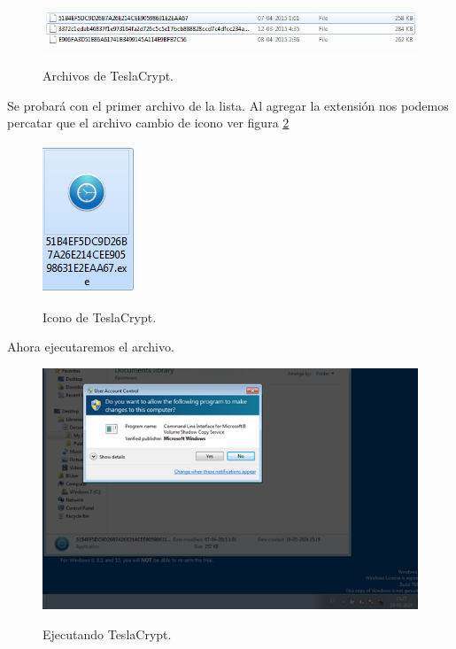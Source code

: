 \documentclass[stu, 11pt, letterpaper, donotrepeattitle, floatsintext, natbib]{apa7}
\begin{document}
\begin{figure}[H]
    \centering
    \caption{Archivos de TeslaCrypt.}
    \includegraphics[width=0.75\linewidth]{ram6.png} %
    \label{fig:OverallEffect}
\end{figure}

Se probará con el primer archivo de la lista. Al agregar la extensión nos podemos percatar que el archivo cambio de icono ver figura \ref{figuraCambioIcono}

\hfill \break
\begin{figure}[H]
    \centering
    \caption{Icono de TeslaCrypt.}
    \includegraphics[width=0.1\linewidth]{ram7.png} %
    \label{figuraCambioIcono}
\end{figure}

Ahora ejecutaremos el archivo.

\begin{figure}[H]
    \centering
    \caption{Ejecutando TeslaCrypt.}
    \includegraphics[width=0.75\linewidth]{ram81.png} %
    \label{fig:OverallEffect}
\end{figure}
\end{document}
